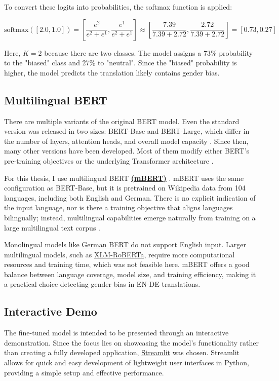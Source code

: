To convert these logits into probabilities, the softmax function is applied:

\[
\text{softmax}([2.0, 1.0]) = \left[\frac{e^2}{e^2 + e^1}, \frac{e^1}{e^2 + e^1}\right] \approx \left[\frac{7.39}{7.39 + 2.72}, \frac{2.72}{7.39 + 2.72}\right] = [0.73, 0.27]
\]

Here, \(K=2\) because there are two classes. The model assigns a 73\% probability to the "biased" class and 27\% to "neutral". Since the "biased" probability is higher, the model predicts the translation likely contains gender bias.

\subsection{Multilingual BERT}
There are multiple variants of the original BERT model. Even the standard version was released in two sizes: BERT-Base and BERT-Large, which differ in the number of layers, attention heads, and overall model capacity \citep{devlinBERTPretrainingDeep2019}. Since then, many other versions have been developed. Most of them modify either BERT’s pre-training objectives or the underlying Transformer architecture \citep{libovickyHowLanguageNeutralMultilingual2019}.

For this thesis, I use multilingual BERT \textbf{\href{https://huggingface.co/google-bert/bert-base-multilingual-cased}{(mBERT)}} \citep{devlinBERTPretrainingDeep2019}. mBERT uses the same configuration as BERT-Base, but it is pretrained on Wikipedia data from 104 languages, including both English and German. There is no explicit indication of the input language, nor is there a training objective that aligns languages bilingually; instead, multilingual capabilities emerge naturally from training on a large multilingual text corpus \citep{piresHowMultilingualMultilingual2019}.

Monolingual models like \href{https://huggingface.co/google-bert/bert-base-german-cased}{German BERT} do not support English input. Larger multilingual models, such as \href{https://huggingface.co/docs/transformers/en/model_doc/xlm-roberta}{XLM-RoBERTa}, require more computational resources and training time, which was not feasible here. mBERT offers a good balance between language coverage, model size, and training efficiency, making it a practical choice detecting gender bias in EN-DE translations.

\subsection{Interactive Demo}
The fine-tuned model is intended to be presented through an interactive demonstration. Since the focus lies on showcasing the model’s functionality rather than creating a fully developed application, \href{https://streamlit.io/}{Streamlit} was chosen. Streamlit allows for quick and easy development of lightweight user interfaces in Python, providing a simple setup and effective performance.

